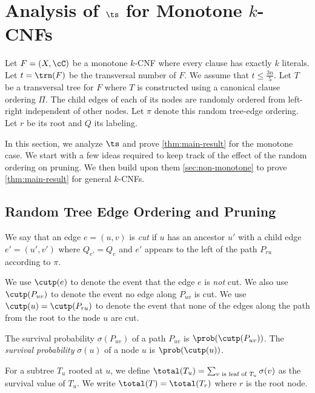 \section{Analysis of $\ts$ for Monotone $k$-CNFs} \label{sec:monotone}

Let $F=(X,\cC)$ be a monotone $k$-CNF where every clause has exactly $k$ literals.
Let $t=\trn(F)$ be the transversal number of $F$. We assume 
that $t\leq \frac{3n}{5}$.
Let $T$ be a transversal tree for $F$ where
$T$ is constructed using a canonical clause ordering $\Pi$.
The child edges of each of its nodes are randomly ordered from left-right independent of other nodes. Let $\pi$ denote this random tree-edge ordering. Let $r$ be its root and $Q$ its labeling.

In this section, we analyze 
$\ts$  
and prove \cref{thm:main-result} for 
the monotone case. We start
with a few ideas required to keep track of the effect of the random ordering on pruning.
We then build upon them 
\cref{sec:non-monotone} to prove \cref{thm:main-result} for general $k$-CNFs.

\subsection{Random Tree Edge Ordering and Pruning}

\begin{definition}
We say that an edge $e=(u,v)$ is \emph{cut} if  
$u$ has an ancestor $u'$ with a child edge $e'= (u',v')$
where $Q_{e'}=Q_e$ and 
$e'$ appears to the left of the path $P_{ru}$ according to $\pi$.
\end{definition}


We use $\cutp(e)$ to denote the event that the edge $e$ is \emph{not} cut.
We also use $\cutp(P_{uv})$ to denote the event no edge along $P_{uv}$ is cut.
We use $\cutp(u)=\cutp(P_{ru})$ to denote the event that none of the edges along the path from the root to the node $u$ are cut. 

\begin{definition}
The survival probability $\sigma(P_{uv})$
of a path $P_{uv}$ is $\prob(\cutp(P_{uv}))$.
The \emph{survival probability} $\sigma(u)$ of a node $u$ is $\prob(\cutp(u))$.
\end{definition}


\begin{definition}
For a subtree $T_u$ rooted at $u$,
we define
$\total(T_u) = \sum_{\text{$v$ is leaf of $T_u$}} \sigma(v)$
as the survival value of $T_u$. We write $\total(T) = \total(T_r)$ where 
$r$ is the root node.
\end{definition}

